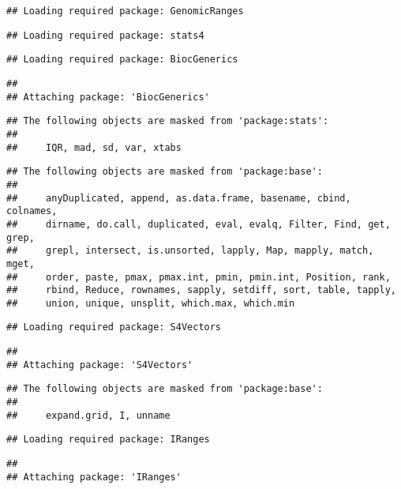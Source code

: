 \documentclass[
]{article}
\begin{document}
\begin{verbatim}
## Loading required package: GenomicRanges
\end{verbatim}

\begin{verbatim}
## Loading required package: stats4
\end{verbatim}

\begin{verbatim}
## Loading required package: BiocGenerics
\end{verbatim}

\begin{verbatim}
## 
## Attaching package: 'BiocGenerics'
\end{verbatim}

\begin{verbatim}
## The following objects are masked from 'package:stats':
## 
##     IQR, mad, sd, var, xtabs
\end{verbatim}

\begin{verbatim}
## The following objects are masked from 'package:base':
## 
##     anyDuplicated, append, as.data.frame, basename, cbind, colnames,
##     dirname, do.call, duplicated, eval, evalq, Filter, Find, get, grep,
##     grepl, intersect, is.unsorted, lapply, Map, mapply, match, mget,
##     order, paste, pmax, pmax.int, pmin, pmin.int, Position, rank,
##     rbind, Reduce, rownames, sapply, setdiff, sort, table, tapply,
##     union, unique, unsplit, which.max, which.min
\end{verbatim}

\begin{verbatim}
## Loading required package: S4Vectors
\end{verbatim}

\begin{verbatim}
## 
## Attaching package: 'S4Vectors'
\end{verbatim}

\begin{verbatim}
## The following objects are masked from 'package:base':
## 
##     expand.grid, I, unname
\end{verbatim}

\begin{verbatim}
## Loading required package: IRanges
\end{verbatim}

\begin{verbatim}
## 
## Attaching package: 'IRanges'
\end{verbatim}
\end{document}
